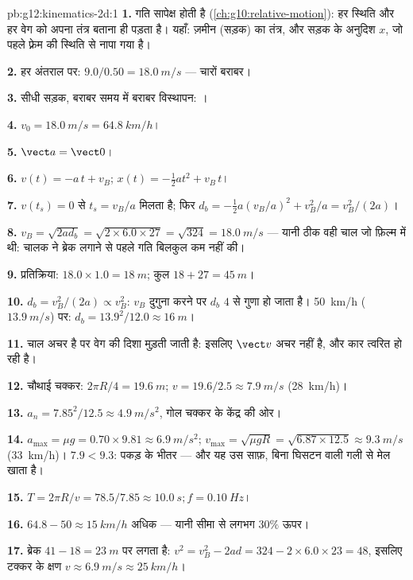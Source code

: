 \begin{solution}{pb:g12:kinematics-2d:1}
\textbf{1.} गति सापेक्ष होती है (\cref{ch:g10:relative-motion}): हर स्थिति और हर वेग को अपना तंत्र
बताना ही पड़ता है। यहाँ: ज़मीन (सड़क) का तंत्र, और सड़क के अनुदिश $x$, जो
पहले फ़्रेम की स्थिति से नापा गया है।

\textbf{2.} हर अंतराल पर: $9.0/0.50 = \qty{18.0}{m/s}$ --- चारों बराबर।

\textbf{3.} सीधी सड़क, बराबर समय में बराबर विस्थापन: ।

\textbf{4.} $v_0 = \qty{18.0}{m/s} = \qty{64.8}{km/h}$।

\textbf{5.} $\vect a = \vect 0$।

\textbf{6.} $v(t) = -a\,t + v_B$; $x(t) = -\tfrac12 a t^2 + v_B\,t$।

\textbf{7.} $v(t_s) = 0$ से $t_s = v_B/a$ मिलता है; फिर $d_b = -\tfrac12 a (v_B/a)^2 + v_B^2/a = v_B^2/(2a)$।

\textbf{8.} $v_B = \sqrt{2 a d_b} = \sqrt{2 \times 6.0 \times 27} =
\sqrt{324} = \qty{18.0}{m/s}$ --- यानी ठीक वही चाल जो फ़िल्म में थी: चालक ने
ब्रेक लगाने से पहले गति बिलकुल कम नहीं की।

\textbf{9.} प्रतिक्रिया: $18.0 \times 1.0 = \qty{18}{m}$; कुल $18 + 27 = \qty{45}{m}$।

\textbf{10.} $d_b = v_B^2/(2a) \propto v_B^2$: $v_B$ दुगुना करने पर $d_b$ $4$ से गुणा हो जाता
है। \qty{50}{km/h} ($\qty{13.9}{m/s}$) पर: $d_b = 13.9^2/12.0 \approx \qty{16}{m}$।

\textbf{11.} चाल अचर है पर वेग की दिशा मुड़ती जाती है: इसलिए $\vect v$
अचर नहीं है, और कार त्वरित हो रही है।

\textbf{12.} चौथाई चक्कर: $2\pi R/4 = \qty{19.6}{m}$; $v = 19.6/2.5 \approx \qty{7.9}{m/s}$ (\qty{28}{km/h})।

\textbf{13.} $a_n = 7.85^2/12.5 \approx \qty{4.9}{m/s^2}$, गोल चक्कर के केंद्र की ओर।

\textbf{14.} $a_{\max} = \mu g = 0.70 \times 9.81 \approx
\qty{6.9}{m/s^2}$; $v_{\max} = \sqrt{\mu g R} =
\sqrt{6.87 \times 12.5} \approx \qty{9.3}{m/s}$ (\qty{33}{km/h})। $7.9 < 9.3$: पकड़ के भीतर --- और यह उस
साफ़, बिना घिसटन वाली गली से मेल खाता है।

\textbf{15.} $T = 2\pi R/v = 78.5/7.85 \approx \qty{10.0}{s};
f = \qty{0.10}{Hz}$।

\textbf{16.} $64.8 - 50 \approx \qty{15}{km/h}$ अधिक --- यानी सीमा से लगभग $30\%$ ऊपर।

\textbf{17.} ब्रेक $41 - 18 = \qty{23}{m}$ पर लगता है: $v^2 = v_B^2 - 2ad = 324 - 2 \times 6.0 \times 23 = 48$, इसलिए टक्कर के क्षण $v \approx \qty{6.9}{m/s} \approx \qty{25}{km/h}$।


\end{solution}
